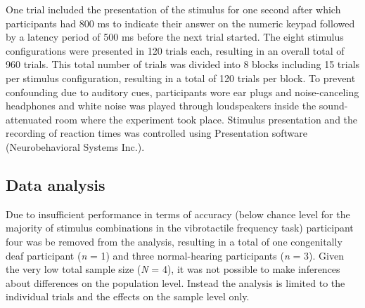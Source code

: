 \documentclass[12pt]{article}
\begin{document}
%
\par One trial included the presentation of the stimulus for one second after which participants had 800 ms to indicate their answer on the numeric keypad followed by a latency period of 500 ms before the next trial started.  The eight stimulus configurations were presented in 120 trials each, resulting in an overall total of 960 trials. This total number of trials was divided into 8 blocks including 15 trials per stimulus configuration, resulting in a total of 120 trials per block. To prevent confounding due to auditory cues, participants wore ear plugs and noise-canceling headphones and white noise was played through loudspeakers inside the sound-attenuated room where the experiment took place. Stimulus presentation and the recording of reaction times was controlled using Presentation software (Neurobehavioral Systems Inc.).
\subsection{Data analysis}
Due to insufficient performance in terms of accuracy (below chance level for the majority of stimulus combinations in the vibrotactile frequency task) participant four was be removed from the analysis, resulting in a total of one congenitally deaf participant (\textit{n} = 1) and three normal-hearing participants (\textit{n} = 3). Given the very low total sample size (\textit{N} = 4), it was not possible to make inferences about differences on the population level. Instead the analysis is limited to the individual trials and the effects on the sample level only.
\end{document}
